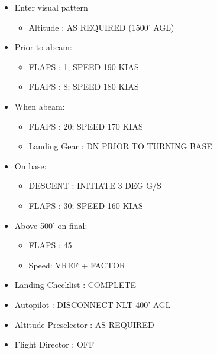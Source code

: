 \begin{itemize}
\item Enter visual pattern

\begin{itemize}
\item Altitude : AS REQUIRED (1500' AGL)

\end{itemize}

\item Prior to abeam:

\begin{itemize}
\item FLAPS : 1; SPEED 190 KIAS

\item FLAPS : 8; SPEED 180 KIAS

\end{itemize}

\item When abeam:

\begin{itemize}
\item FLAPS : 20; SPEED 170 KIAS

\item Landing Gear : DN PRIOR TO TURNING BASE

\end{itemize}

\item On base:

\begin{itemize}
\item DESCENT : INITIATE 3 DEG G\slash S

\item FLAPS : 30; SPEED 160 KIAS

\end{itemize}

\item Above 500' on final:

\begin{itemize}
\item FLAPS : 45

\item Speed: VREF + FACTOR

\end{itemize}

\item Landing Checklist : COMPLETE

\item Autopilot : DISCONNECT NLT 400' AGL

\item Altitude Preselector : AS REQUIRED

\item Flight Director : OFF

\end{itemize}

